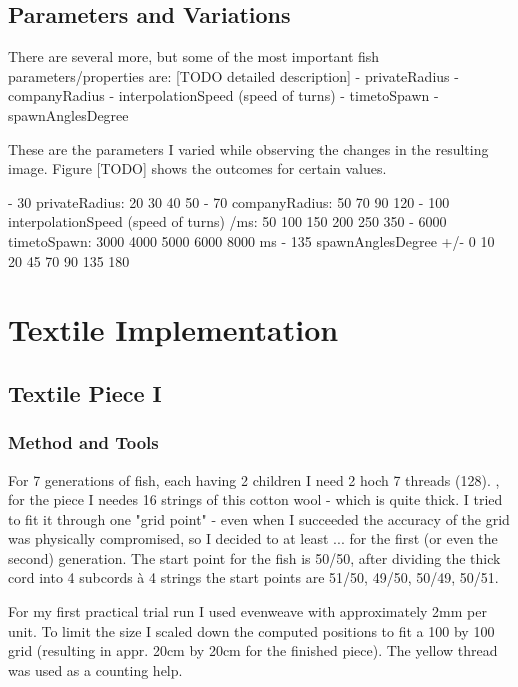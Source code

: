 \documentclass{scrartcl}
\begin{document}
\subsection{Parameters and Variations} %
There are several more, but some of the most important fish parameters/properties are:
[TODO detailed description]
- privateRadius
- companyRadius
- interpolationSpeed (speed of turns)
- timetoSpawn
- spawnAnglesDegree

These are the parameters I varied while observing the changes in the resulting image.
Figure [TODO] shows the outcomes for certain values.

- 30 privateRadius: 20 30 40 50
- 70 companyRadius: 50 70 90 120
- 100 interpolationSpeed (speed of turns) /ms: 50 100 150 200 250 350
- 6000 timetoSpawn: 3000 4000 5000 6000 8000 ms
- 135 spawnAnglesDegree +/- 0 10 20 45 70 90 135 180

\section{Textile Implementation}

\subsection{Textile Piece I}
\subsubsection{Method and Tools}

For 7 generations of fish, each having 2 children I need 2 hoch 7 threads (128). , for the piece I needes 16 strings of this cotton wool - which is quite thick. I tried to fit it through one "grid point" - even when I succeeded the accuracy of the grid was physically compromised, so I decided to at least ... for the first (or even the second) generation. The start point for the fish is 50/50, after dividing the thick cord into 4 subcords à 4 strings the start points are 51/50, 49/50, 50/49, 50/51.\\

\begin{minipage}[t]{0.48\textwidth}
\end{minipage}
\hspace{0.5cm}
\begin{minipage}[t]{0.48\textwidth}
    For my first practical trial run I used evenweave with approximately 2mm per unit. To limit the size I scaled down the computed positions to fit a 100 by 100 grid (resulting in appr. 20cm by 20cm for the finished piece). The yellow thread was used as a counting help.
\end{minipage}
\vspace{0.5cm}
\end{document}
